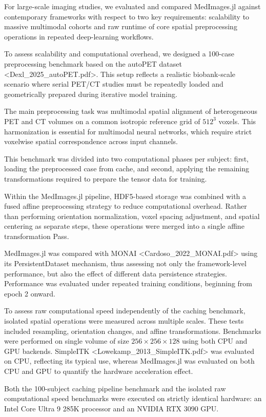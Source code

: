 \documentclass[10pt,letterpaper]{article}
\begin{document}
For large-scale imaging studies, we evaluated and compared MedImages.jl against contemporary frameworks with respect to two key requirements: scalability to massive multimodal cohorts and raw runtime of core spatial preprocessing operations in repeated deep-learning workflows.

To assess scalability and computational overhead, we designed a 100-case preprocessing benchmark based on the autoPET dataset <Dexl_2025_autoPET.pdf>. This setup reflects a realistic biobank-scale scenario where serial PET/CT studies must be repeatedly loaded and geometrically prepared during iterative model training.

The main preprocessing task was multimodal spatial alignment of heterogeneous PET and CT volumes on a common isotropic reference grid of $512^3$ voxels. This harmonization is essential for multimodal neural networks, which require strict voxelwise spatial correspondence across input channels.

This benchmark was divided into two computational phases per subject: first, loading the preprocessed case from cache, and second, applying the remaining transformations required to prepare the tensor data for training.

Within the MedImages.jl pipeline, HDF5-based storage was combined with a fused affine preprocessing strategy to reduce computational overhead. Rather than performing orientation normalization, voxel spacing adjustment, and spatial centering as separate steps, these operations were merged into a single affine transformation Pass.

MedImages.jl was compared with MONAI <Cardoso_2022_MONAI.pdf> using its PersistentDataset mechanism, thus assessing not only the framework-level performance, but also the effect of different data persistence strategies. Performance was evaluated under repeated training conditions, beginning from epoch 2 onward.

To assess raw computational speed independently of the caching benchmark, isolated spatial operations were measured across multiple scales. These tests included resampling, orientation changes, and affine transformations. Benchmarks were performed on single volume of size $256 \times 256 \times 128$ using both CPU and GPU backends. SimpleITK <Lowekamp_2013_SimpleITK.pdf> was evaluated on CPU, reflecting its typical use, whereas MedImages.jl was evaluated on both CPU and GPU to quantify the hardware acceleration effect.

Both the 100-subject caching pipeline benchmark and the isolated raw computational speed benchmarks were executed on strictly identical hardware: an Intel Core Ultra 9 285K processor and an NVIDIA RTX 3090 GPU.
\end{document}
